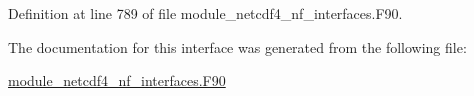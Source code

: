 Definition at line 789 of file module\+\_\+netcdf4\+\_\+nf\+\_\+interfaces.\+F90.



The documentation for this interface was generated from the following file\+:\begin{DoxyCompactItemize}
\item 
\hyperlink{module__netcdf4__nf__interfaces_8F90}{module\+\_\+netcdf4\+\_\+nf\+\_\+interfaces.\+F90}\end{DoxyCompactItemize}
